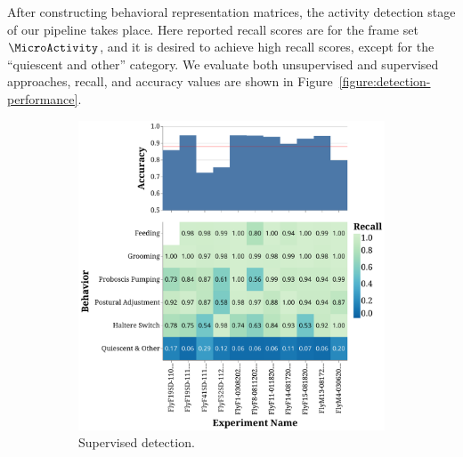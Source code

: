 After constructing behavioral representation matrices, the activity detection stage of our pipeline takes place.
Here reported recall scores are for the frame set $\MicroActivity$, and it is desired to achieve high recall scores, except for the ``quiescent and other'' category.
We evaluate both unsupervised and supervised approaches, recall, and accuracy values are shown in Figure~\ref{figure:detection-performance}.

\begin{figure}[htb!]
	\centering
	\begin{subfigure}[b]{0.495\linewidth}
		\centering\includegraphics[width=\linewidth]{figures/ActivityDetectionPerformance-Supervised.pdf}
		\caption{Supervised detection.}
	\end{subfigure}%
	\hfill
	\begin{subfigure}[b]{0.495\linewidth}

\end{subfigure}
\end{figure}
